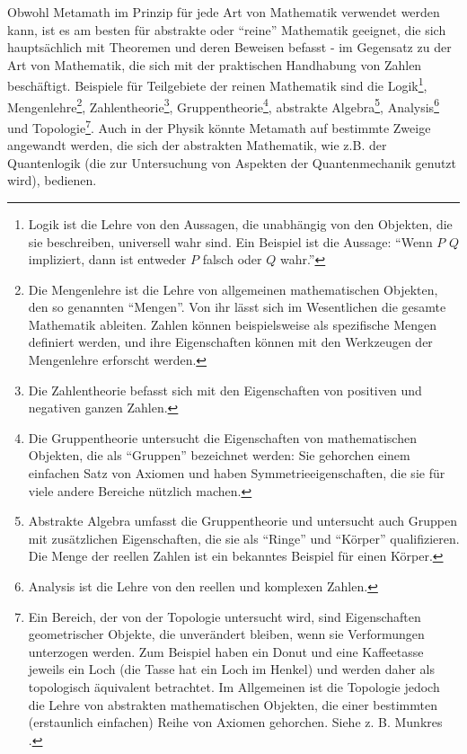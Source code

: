Obwohl Metamath im Prinzip für jede Art von Mathematik verwendet werden kann, ist es am besten für abstrakte oder "`reine"' Mathematik geeignet, die sich hauptsächlich mit Theoremen und deren Beweisen befasst - im Gegensatz zu der Art von Mathematik, die sich mit der praktischen Handhabung von Zahlen beschäftigt.
Beispiele für Teilgebiete der reinen Mathematik sind die Logik\footnote{Logik ist die Lehre von den Aussagen, die unabhängig von den Objekten, die sie beschreiben, universell wahr sind. Ein Beispiel ist die Aussage: "`Wenn $P$	$Q$ impliziert, dann ist entweder $P$ falsch oder $Q$ wahr."'}, Mengenlehre\footnote{Die Mengenlehre ist die Lehre von allgemeinen mathematischen Objekten, den so genannten "`Mengen"'. Von ihr lässt sich im Wesentlichen die gesamte Mathematik ableiten. Zahlen können beispielsweise als spezifische Mengen definiert werden, und ihre Eigenschaften können mit den Werkzeugen der Mengenlehre erforscht werden.}, Zahlentheorie\footnote{Die Zahlentheorie befasst sich mit den Eigenschaften von positiven und negativen ganzen Zahlen.}, Gruppentheorie\footnote{Die Gruppentheorie untersucht die Eigenschaften von mathematischen Objekten, die als "`Gruppen"' bezeichnet werden: Sie gehorchen einem einfachen Satz von Axiomen und haben Symmetrieeigenschaften, die sie für viele andere Bereiche nützlich machen.}, abstrakte Algebra\footnote{Abstrakte Algebra umfasst die Gruppentheorie und untersucht auch Gruppen mit zusätzlichen Eigenschaften, die sie als "`Ringe"' und "`Körper"' qualifizieren.  Die Menge der reellen Zahlen ist ein bekanntes Beispiel für einen Körper.}, Analysis\footnote{Analysis ist die Lehre von den reellen und komplexen Zahlen.} und Topologie\footnote{Ein Bereich, der von der Topologie untersucht wird, sind Eigenschaften geometrischer Objekte, die unverändert bleiben, wenn sie Verformungen unterzogen werden.  Zum Beispiel haben ein Donut und eine Kaffeetasse jeweils ein Loch (die Tasse hat ein Loch im Henkel) und werden daher als topologisch äquivalent betrachtet.  Im Allgemeinen ist die Topologie jedoch die Lehre von abstrakten mathematischen Objekten, die einer bestimmten (erstaunlich einfachen) Reihe von Axiomen gehorchen. Siehe z. B. Munkres \cite{Munkres}.}. Auch in der Physik könnte Metamath auf bestimmte Zweige angewandt werden, die sich der abstrakten Mathematik, wie z.B. der Quantenlogik (die zur Untersuchung von Aspekten der Quantenmechanik genutzt wird), bedienen.

